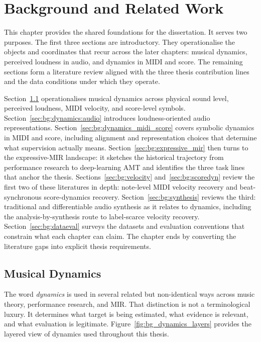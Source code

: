 \chapter{Background and Related Work}
\label{ch:background}

This chapter provides the shared foundations for the dissertation. It serves two purposes. The first three sections are introductory. They operationalise the objects and coordinates that recur across the later chapters: musical dynamics, perceived loudness in audio, and dynamics in MIDI and score. The remaining sections form a literature review aligned with the three thesis contribution lines and the data conditions under which they operate.

Section~\ref{sec:bg:dynamics} operationalises musical dynamics across physical sound level, perceived loudness, MIDI velocity, and score-level symbols. Section~\ref{sec:bg:dynamics:audio} introduces loudness-oriented audio representations. Section~\ref{sec:bg:dynamics_midi_score} covers symbolic dynamics in MIDI and score, including alignment and representation choices that determine what supervision actually means. Section~\ref{sec:bg:expressive_mir} then turns to the expressive-MIR landscape: it sketches the historical trajectory from performance research to deep-learning AMT and identifies the three task lines that anchor the thesis. Sections~\ref{sec:bg:velocity} and~\ref{sec:bg:scoredyn} review the first two of these literatures in depth: note-level MIDI velocity recovery and beat-synchronous score-dynamics recovery. Section~\ref{sec:bg:synthesis} reviews the third: traditional and differentiable audio synthesis as it relates to dynamics, including the analysis-by-synthesis route to label-scarce velocity recovery. Section~\ref{sec:bg:dataeval} surveys the datasets and evaluation conventions that constrain what each chapter can claim. The chapter ends by converting the literature gaps into explicit thesis requirements.

\section{Musical Dynamics}
\label{sec:bg:dynamics}

The word \emph{dynamics} is used in several related but non-identical ways across music theory, performance research, and MIR. That distinction is not a terminological luxury. It determines what target is being estimated, what evidence is relevant, and what evaluation is legitimate. Figure~\ref{fig:bg_dynamics_layers} provides the layered view of dynamics used throughout this thesis.

